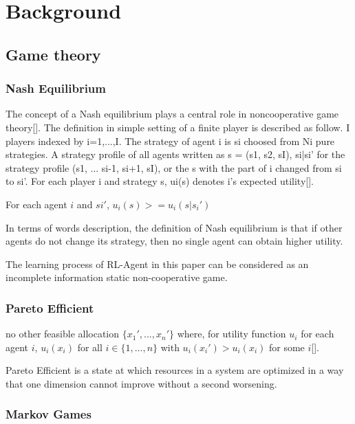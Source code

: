 \chapter{Background}

\section{Game theory}

\subsection{Nash Equilibrium}
The concept of a Nash equilibrium plays a central role in noncooperative game theory[]. The definition in simple setting of a finite player is described as follow. I players indexed by i=1,...,I. The strategy of agent i is si choosed from Ni pure strategies. A strategy profile of all agents written as s = (s1, s2, sI), si|si' for the strategy profile (s1, ... si-1, si+1, sI), or the s with the part of i changed from si to si'. For each player i and strategy s, ui(s) denotes i's expected utility[]. 

\begin{proposition}
For each agent $i$ and $si'$, $u_i(s) >= u_i(s|s_i')$
\end{proposition}

In terms of words description, the definition of Nash equilibrium is that if other agents do not change its strategy, then no single agent can obtain higher utility. 

The learning process of RL-Agent in this paper can be considered as an incomplete information static non-cooperative game.
 
\subsection{Pareto Efficient}

\begin{proposition}
no other feasible allocation $\{x_{1}',...,x_{n}'\}$ where, for 
utility function $u_i$ for each agent $i$, $u_{i}(x_{i})$ for all $i\in \{1,...,n\}$ with $u_{i}(x_{i}')>u_{i}(x_{i})$ for some $i$[].
\end{proposition}

Pareto Efficient is a state at which resources in a system are optimized in a way that one dimension cannot improve without a second worsening. 

\subsection{Markov Games}
